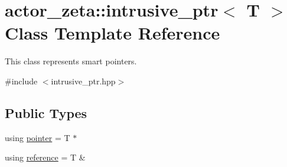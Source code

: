 \hypertarget{classactor__zeta_1_1intrusive__ptr}{}\section{actor\+\_\+zeta\+:\+:intrusive\+\_\+ptr$<$ T $>$ Class Template Reference}
\label{classactor__zeta_1_1intrusive__ptr}


This class represents smart pointers.  




{\ttfamily \#include $<$intrusive\+\_\+ptr.\+hpp$>$}

\subsection*{Public Types}
\begin{DoxyCompactItemize}
\item 
using \hyperlink{classactor__zeta_1_1intrusive__ptr_a149a1cdd3f154db67d7f53a371bfc4e4}{pointer} = T $\ast$
\item 
using \hyperlink{classactor__zeta_1_1intrusive__ptr_a016742eccc554bd6f7af0db0cf584abb}{reference} = T \&
\end{DoxyCompactItemize}

